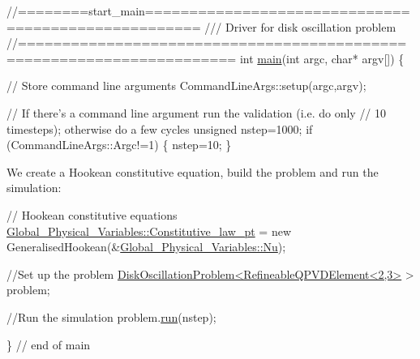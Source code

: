  
\begin{DoxyCodeInclude}
\textcolor{comment}{//========start\_main====================================================}
\textcolor{comment}{/// Driver for disk oscillation problem}
\textcolor{comment}{}\textcolor{comment}{//======================================================================}
\textcolor{keywordtype}{int} \hyperlink{disk__oscillation_8cc_a0ddf1224851353fc92bfbff6f499fa97}{main}(\textcolor{keywordtype}{int} argc, \textcolor{keywordtype}{char}* argv[])
\{

 \textcolor{comment}{// Store command line arguments}
 CommandLineArgs::setup(argc,argv);

 \textcolor{comment}{// If there's a command line argument run the validation (i.e. do only }
 \textcolor{comment}{// 10 timesteps); otherwise do a few cycles}
 \textcolor{keywordtype}{unsigned} nstep=1000;
 \textcolor{keywordflow}{if} (CommandLineArgs::Argc!=1)
  \{
   nstep=10;
  \}

\end{DoxyCodeInclude}


We create a Hookean constitutive equation, build the problem and run the simulation\+:


\begin{DoxyCodeInclude}

 \textcolor{comment}{// Hookean constitutive equations}
 \hyperlink{namespaceGlobal__Physical__Variables_a2a37fb040c832ee7a086bb13bb02a100}{Global\_Physical\_Variables::Constitutive\_law\_pt} = 
  \textcolor{keyword}{new} GeneralisedHookean(&\hyperlink{namespaceGlobal__Physical__Variables_a3962c36313826b19f216f6bbbdd6a477}{Global\_Physical\_Variables::Nu});
 
 \textcolor{comment}{//Set up the problem}
 \hyperlink{classDiskOscillationProblem}{DiskOscillationProblem<RefineableQPVDElement<2,3>} > 
      problem;
 
 \textcolor{comment}{//Run the simulation}
 problem.\hyperlink{classDiskOscillationProblem_ac0f7b36ffffa73ee49bc95bd961835dd}{run}(nstep);
 
\} \textcolor{comment}{// end of main}

\end{DoxyCodeInclude}




 

